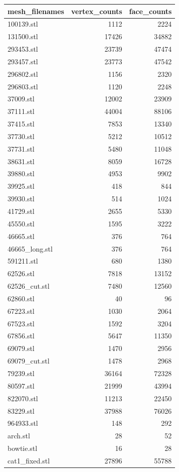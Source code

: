 \begin{tabular}{lrr}
\toprule
mesh\_filenames & vertex\_counts & face\_counts \\
\midrule
100139.stl & 1112 & 2224 \\
131500.stl & 17426 & 34882 \\
293453.stl & 23739 & 47474 \\
293457.stl & 23773 & 47542 \\
296802.stl & 1156 & 2320 \\
296803.stl & 1120 & 2248 \\
37009.stl & 12002 & 23909 \\
37111.stl & 44004 & 88106 \\
37415.stl & 7853 & 13340 \\
37730.stl & 5212 & 10512 \\
37731.stl & 5480 & 11048 \\
38631.stl & 8059 & 16728 \\
39880.stl & 4953 & 9902 \\
39925.stl & 418 & 844 \\
39930.stl & 514 & 1024 \\
41729.stl & 2655 & 5330 \\
45550.stl & 1595 & 3222 \\
46665.stl & 376 & 764 \\
46665\_long.stl & 376 & 764 \\
591211.stl & 680 & 1380 \\
62526.stl & 7818 & 13152 \\
62526\_cut.stl & 7480 & 12560 \\
62860.stl & 40 & 96 \\
67223.stl & 1030 & 2064 \\
67523.stl & 1592 & 3204 \\
67856.stl & 5647 & 11350 \\
69079.stl & 1470 & 2956 \\
69079\_cut.stl & 1478 & 2968 \\
79239.stl & 36164 & 72328 \\
80597.stl & 21999 & 43994 \\
822070.stl & 11213 & 22450 \\
83229.stl & 37988 & 76026 \\
964933.stl & 148 & 292 \\
arch.stl & 28 & 52 \\
bowtie.stl & 16 & 28 \\
cat1\_fixed.stl & 27896 & 55788 \\

\end{tabular}
